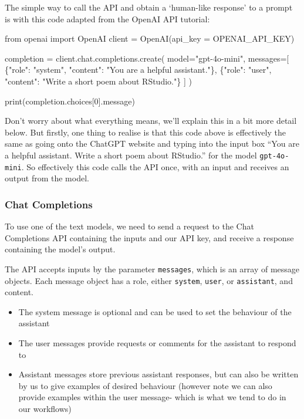 \documentclass[
  letterpaper,
  DIV=11,
  numbers=noendperiod]{scrreprt}
\newenvironment{Shaded}{\begin{snugshade}}{\end{snugshade}}
\newcommand{\AttributeTok}[1]{\textcolor[rgb]{0.40,0.45,0.13}{#1}}
\newcommand{\DecValTok}[1]{\textcolor[rgb]{0.68,0.00,0.00}{#1}}
\newcommand{\FunctionTok}[1]{\textcolor[rgb]{0.28,0.35,0.67}{#1}}
\newcommand{\NormalTok}[1]{\textcolor[rgb]{0.00,0.23,0.31}{#1}}
\newcommand{\OtherTok}[1]{\textcolor[rgb]{0.00,0.23,0.31}{#1}}
\newcommand{\SpecialCharTok}[1]{\textcolor[rgb]{0.37,0.37,0.37}{#1}}
\newcommand{\StringTok}[1]{\textcolor[rgb]{0.13,0.47,0.30}{#1}}
\providecommand{\tightlist}{%
  \setlength{\itemsep}{0pt}\setlength{\parskip}{0pt}}\usepackage{longtable,booktabs,array}
\begin{document}
The simple way to call the API and obtain a `human-like response' to a
prompt is with this code adapted from the OpenAI API tutorial:

\begin{Shaded}
\begin{Highlighting}[]
\NormalTok{from openai import OpenAI}
\NormalTok{client }\OtherTok{=} \FunctionTok{OpenAI}\NormalTok{(}\AttributeTok{api\_key =}\NormalTok{ OPENAI\_API\_KEY)}

\NormalTok{completion }\OtherTok{=} \FunctionTok{client.chat.completions.create}\NormalTok{(}
    \AttributeTok{model=}\StringTok{"gpt{-}4o{-}mini"}\NormalTok{,}
    \AttributeTok{messages=}\NormalTok{[}
\NormalTok{        \{}\StringTok{"role"}\SpecialCharTok{:} \StringTok{"system"}\NormalTok{, }\StringTok{"content"}\SpecialCharTok{:} \StringTok{"You are a helpful assistant."}\NormalTok{\},}
\NormalTok{        \{}\StringTok{"role"}\SpecialCharTok{:} \StringTok{"user"}\NormalTok{, }\StringTok{"content"}\SpecialCharTok{:} \StringTok{"Write a short poem about RStudio."}\NormalTok{\}}
\NormalTok{    ]}
\NormalTok{)}

\FunctionTok{print}\NormalTok{(completion.choices[}\DecValTok{0}\NormalTok{].message)}
\end{Highlighting}
\end{Shaded}

Don't worry about what everything means, we'll explain this in a bit
more detail below. But firstly, one thing to realise is that this code
above is effectively the same as going onto the ChatGPT website and
typing into the input box ``You are a helpful assistant. Write a short
poem about RStudio.'' for the model \texttt{gpt-4o-mini}. So effectively
this code calls the API once, with an input and receives an output from
the model.

\subsubsection{Chat Completions}\label{chat-completions}

To use one of the text models, we need to send a request to the Chat
Completions API containing the inputs and our API key, and receive a
response containing the model's output.

The API accepts inputs by the parameter \texttt{messages}, which is an
array of message objects. Each message object has a role, either
\texttt{system}, \texttt{user}, or \texttt{assistant}, and content.

\begin{itemize}
\tightlist
\item
  The system message is optional and can be used to set the behaviour of
  the assistant
\item
  The user messages provide requests or comments for the assistant to
  respond to
\item
  Assistant messages store previous assistant responses, but can also be
  written by us to give examples of desired behaviour (however note we
  can also provide examples within the user message- which is what we
  tend to do in our workflows)
\end{itemize}
\end{document}

